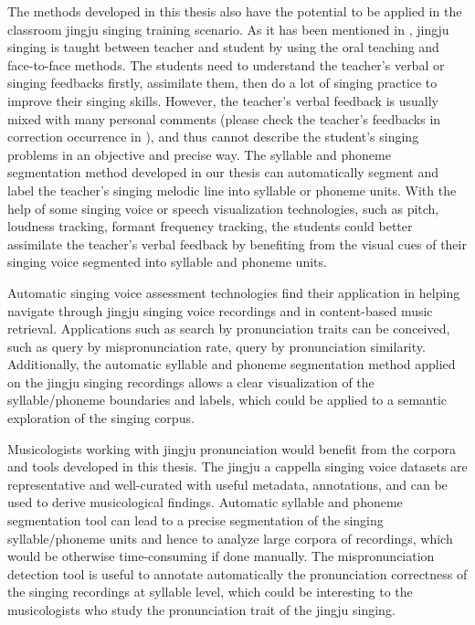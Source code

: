 The methods developed in this thesis also have the potential to be applied in the classroom jingju singing training scenario. As it has been mentioned in , jingju singing is taught between teacher and student by using the oral teaching and face-to-face methods. The students need to understand the teacher's verbal or singing feedbacks firstly, assimilate them, then do a lot of singing practice to improve their singing skills. However, the teacher's verbal feedback is usually mixed with many personal comments (please check the teacher's feedbacks in correction occurrence in ), and thus cannot describe the student's singing problems in an objective and precise way. The syllable and phoneme segmentation method developed in our thesis can automatically segment and label the teacher's singing melodic line into syllable or phoneme units. With the help of some singing voice or speech visualization technologies, such as pitch, loudness tracking, formant frequency tracking, the students could better assimilate the teacher's verbal feedback by benefiting from the visual cues of their singing voice segmented into syllable and phoneme units.

Automatic singing voice assessment technologies find their application in helping navigate through jingju singing voice recordings and in content-based music retrieval. Applications such as search by pronunciation traits can be conceived, such as query by mispronunciation rate, query by pronunciation similarity. Additionally, the automatic syllable and phoneme segmentation method applied on the jingju singing recordings allows a clear visualization of the syllable/phoneme boundaries and labels, which could be applied to a semantic exploration of the singing corpus.

Musicologists working with jingju pronunciation would benefit from the corpora and tools developed in this thesis. The jingju a cappella singing voice datasets are representative and well-curated with useful metadata, annotations, and can be used to derive musicological findings. Automatic syllable and phoneme segmentation tool can lead to a precise segmentation of the singing syllable/phoneme units and hence to analyze large corpora of recordings, which would be otherwise time-consuming if done manually. The mispronunciation detection tool is useful to annotate automatically the pronunciation correctness of the singing recordings at syllable level, which could be interesting to the musicologists who study the pronunciation trait of the jingju singing.

